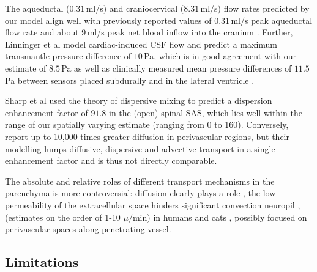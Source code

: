 \documentclass[fleqn,10pt]{wlscirep}
\begin{document}
The aqueductal ($0.31\,$ml/s) and craniocervical ($8.31\,$ml/s) flow rates predicted by our model align well with previously reported values of $0.31\,$ml/s peak aqueductal flow rate \cite{vinje2019respiratory} and about $9\,$ml/s peak net blood inflow into the cranium \cite{baledent2014imaging}. Further, Linninger et al \cite{linninger2007cerebrospinal} model cardiac-induced CSF flow and predict a maximum transmantle pressure difference of $10\,$Pa, which is in good agreement with our estimate of $8.5\,$Pa as well as clinically measured mean pressure differences of $11.5\,$Pa between sensors placed subdurally and in the lateral ventricle \cite{vinje2019respiratory}.

Sharp et al used the theory of dispersive mixing to predict a dispersion enhancement factor of $91.8$ in the (open) spinal SAS, which lies well within the range of our spatially varying estimate (ranging from 0 to 160). Conversely, \cite{ray2021quantitative} report up to 10,000 times greater diffusion in perivascular regions, but their modelling lumps diffusive, dispersive and advective transport in a single enhancement factor and is thus not directly comparable.

The absolute and relative roles of different transport mechanisms in
the parenchyma is more controversial: diffusion clearly plays a role
\cite{nicolson}, the low permeability of the extracellular space
hinders significant convection neuropil \cite{holter}, (estimates on
the order of 1-10 $\mu$/min) in humans \cite{vinje2023human} and cats
\cite{cserr}, possibly focused on perivascular spaces along
penetrating vessel.




\subsection*{Limitations}
\end{document}
